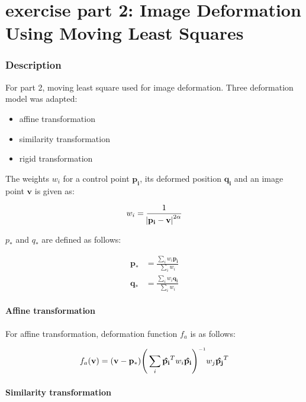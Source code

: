 \documentclass[paper=a4, fontsize=11pt]{scrartcl} %
\numberwithin{equation}{section} %
\numberwithin{figure}{section} %
\numberwithin{table}{section} %
\newcommand{\inv}{^{\raisebox{.2ex}{$\scriptscriptstyle-1$}}}
\renewcommand{\vec}[1]{\mathbf{#1}}
\begin{document}
\section{exercise part 2: Image Deformation Using Moving Least Squares}


\subsubsection{Description}

For part 2, moving least square used for image deformation. Three deformation model was adapted:

\begin{itemize}
	\item affine transformation
	\item similarity transformation 
	\item rigid transformation
\end{itemize}

The weights $w_i$ for a control point $\vec{p_i}$, its deformed position $\vec{q_i}$ and an image point $\vec{v}$ is given as:

\begin{equation}
	w_i = \frac{1}{\abs{\vec{p_i} - \vec{v}} ^ {2 \alpha}}
\end{equation}

$p_*$ and $q_*$ are defined as follows:

\begin{align}
	\vec{p_*} &= \frac{\sum_i w_i \vec{p_i}}{\sum_i w_i} \\
	\vec{q_*} &= \frac{\sum_i w_i \vec{q_i}}{\sum_i w_i}  
\end{align}

\paragraph{Affine transformation} 

For affine transformation, deformation function $f_a$ is as follows:

\begin{equation}
	f_a(\vec{v}) = (\vec{v} - \vec{p_*}) \Bigg( \sum_i \vec{\hat{p_i}}^T w_i \vec{\hat{p_i}} \Bigg) \inv w_j \vec{\hat{p_j}}^T
\end{equation} 

\paragraph{Similarity transformation}
\end{document}
